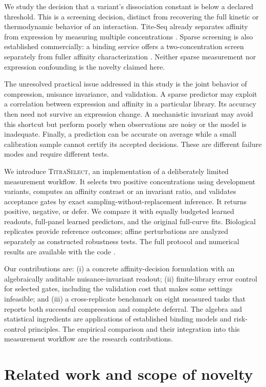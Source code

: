 \documentclass[11pt,letterpaper]{article}
\newcommand{\method}{\textsc{TitraSelect}}
\begin{document}
We study the decision that a variant's dissociation constant is below a declared threshold. This is a screening decision, distinct from recovering the full kinetic or thermodynamic behavior of an interaction. Tite-Seq already separates affinity from expression by measuring multiple concentrations \citep{adams2016}. Sparse screening is also established commercially: a binding service offers a two-concentration screen separately from fuller affinity characterization \citep{adaptyv}. Neither sparse measurement nor expression confounding is the novelty claimed here.

The unresolved practical issue addressed in this study is the joint behavior of compression, nuisance invariance, and validation. A sparse predictor may exploit a correlation between expression and affinity in a particular library. Its accuracy then need not survive an expression change. A mechanistic invariant may avoid this shortcut but perform poorly when observations are noisy or the model is inadequate. Finally, a prediction can be accurate on average while a small calibration sample cannot certify its accepted decisions. These are different failure modes and require different tests.

We introduce \method, an implementation of a deliberately limited measurement workflow. It selects two positive concentrations using development variants, computes an affinity contrast or an invariant ratio, and validates acceptance gates by exact sampling-without-replacement inference. It returns positive, negative, or defer. We compare it with equally budgeted learned readouts, full-panel learned predictors, and the original full-curve fits. Biological replicates provide reference outcomes; affine perturbations are analyzed separately as constructed robustness tests. The full protocol and numerical results are available with the code \citep{artifact}.

Our contributions are: (i) a concrete affinity-decision formulation with an algebraically auditable nuisance-invariant readout; (ii) finite-library error control for selected gates, including the validation cost that makes some settings infeasible; and (iii) a cross-replicate benchmark on eight measured tasks that reports both successful compression and complete deferral. The algebra and statistical ingredients are applications of established binding models and risk-control principles. The empirical comparison and their integration into this measurement workflow are the research contributions.

\section{Related work and scope of novelty}
\end{document}

